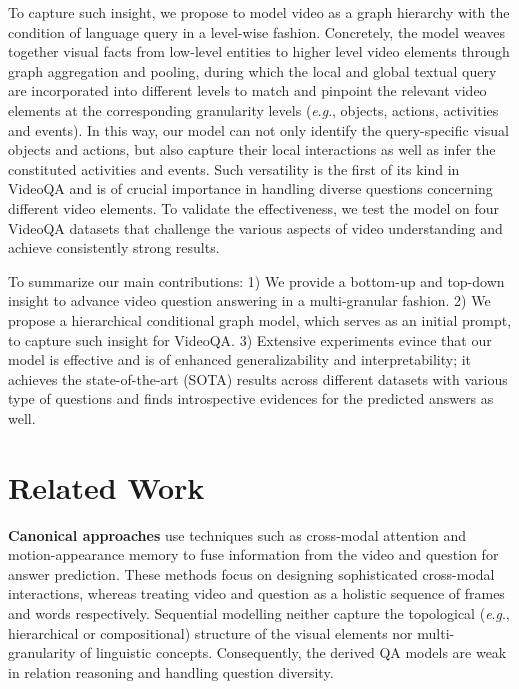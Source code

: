 \documentclass[letterpaper]{article} \usepackage{aaai21}  \usepackage{times}  \usepackage{helvet} \usepackage{courier}  \usepackage[hyphens]{url}  \usepackage{graphicx} \urlstyle{rm} \def\UrlFont{\rm}  \usepackage{natbib}  \usepackage{caption} \usepackage{color, colortbl}
\newcommand{\eg}{\textit{e}.\textit{g}.}
\begin{document}
To capture such insight, we propose to model video as a graph hierarchy with the condition of language query in a level-wise fashion. Concretely, the model weaves together visual facts from low-level entities to higher level video elements through graph aggregation and pooling, during which the local and global textual query are incorporated into different levels to match and pinpoint the relevant video elements at the corresponding granularity levels (\eg, objects, actions, activities and events). In this way, our model can not only identify the query-specific visual objects and actions, but also capture their local interactions as well as infer the constituted activities and events. Such versatility is the first of its kind in VideoQA and is of crucial importance in handling diverse questions concerning different video elements. To validate the effectiveness, we test the model on four VideoQA datasets that challenge the various aspects of video understanding and achieve consistently strong results.


To summarize our main contributions: 
1) We provide a bottom-up and top-down insight to advance video question answering in a multi-granular fashion. 2) We propose a hierarchical conditional graph model, which serves as an initial prompt, to capture such insight for VideoQA. 3) Extensive experiments evince that our model is effective and is of enhanced generalizability and interpretability; it achieves the state-of-the-art (SOTA) results across different datasets with various type of questions and finds introspective evidences for the predicted answers as well.

\section{Related Work}
\label{sec:review}
\textbf{Canonical approaches} 
use techniques such as cross-modal attention \cite{jang2017,zeng2017leveraging,li2019beyond,jin2019multi,gao2019structured, jiang2020divide} and motion-appearance memory \cite{xu2017video,gao2018motion,fan2019heterogeneous} to fuse information from the video and question for answer prediction. These methods focus on designing sophisticated cross-modal interactions, whereas treating video and question as a holistic sequence of frames and words respectively. Sequential modelling neither capture the topological (\eg, hierarchical or compositional) structure of the visual elements nor multi-granularity of linguistic concepts. Consequently, the derived QA models are weak in relation reasoning and handling question diversity. 
\end{document}
